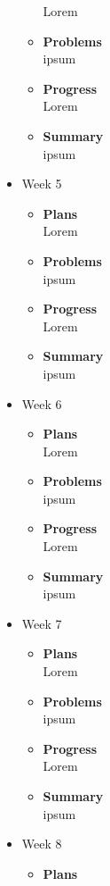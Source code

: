 \begin{itemize}
\begin{itemize}
				Lorem
				\item \textbf{Problems} \\
				ipsum
				\item \textbf{Progress} \\
				Lorem
				\item \textbf{Summary} \\
				ipsum
			\end{itemize}
		\item{Week 5}
			\begin{itemize}
				\item \textbf{Plans} \\
				Lorem
				\item \textbf{Problems} \\
				ipsum
				\item \textbf{Progress} \\
				Lorem
				\item \textbf{Summary} \\
				ipsum
			\end{itemize}
		\item{Week 6}
			\begin{itemize}
				\item \textbf{Plans} \\
				Lorem
				\item \textbf{Problems} \\
				ipsum
				\item \textbf{Progress} \\
				Lorem
				\item \textbf{Summary} \\
				ipsum
			\end{itemize}
		\item{Week 7}
			\begin{itemize}
				\item \textbf{Plans} \\
				Lorem
				\item \textbf{Problems} \\
				ipsum
				\item \textbf{Progress} \\
				Lorem
				\item \textbf{Summary} \\
				ipsum
			\end{itemize}
		\item{Week 8}
			\begin{itemize}
				\item \textbf{Plans} \\

\end{itemize}
\end{itemize}
